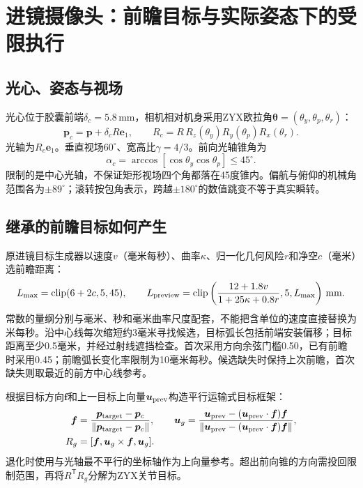 \documentclass[UTF8,a4paper,zihao=5,fontset=windows]{ctexart}
\newcommand{\vect}[1]{\bm{#1}}
\newcommand{\norm}[1]{\left\lVert#1\right\rVert}
\newcommand{\clip}{\operatorname{clip}}
\newcommand{\unit}[1]{\,\mathrm{#1}}
\begin{document}
\section{进镜摄像头：前瞻目标与实际姿态下的受限执行}
\subsection{光心、姿态与视场}
光心位于胶囊前端$\delta_c=5.8\unit{mm}$，相机相对机身采用ZYX欧拉角$\vect\theta=(\theta_y,\theta_p,\theta_r)$：
\begin{equation}
\vect p_c=\vect p+\delta_cR\vect e_1,\qquad
R_c=R\,R_z(\theta_y)R_y(\theta_p)R_x(\theta_r).
\label{eq:camera_mount}
\end{equation}
光轴为$R_c\vect e_1$。垂直视场$60^\circ$、宽高比$\gamma=4/3$。前向光轴锥角为
\begin{equation}
\alpha_c=\arccos[\cos\theta_y\cos\theta_p]\le45^\circ.
\label{eq:camera_cone}
\end{equation}
限制的是中心光轴，不保证矩形视场四个角都落在45度锥内。偏航与俯仰的机械角范围各为$\pm89^\circ$；滚转按包角表示，跨越$\pm180^\circ$的数值跳变不等于真实瞬转。

\subsection{继承的前瞻目标如何产生}
原进镜目标生成器以速度$v$（毫米每秒）、曲率$\kappa$、归一化几何风险$r$和净空$c$（毫米）选前瞻距离：
\begin{equation}
L_{\max}=\clip(6+2c,5,45),\qquad
L_{\rm preview}=\clip\left(\frac{12+1.8v}{1+25\kappa+0.8r},5,L_{\max}\right)\unit{mm}.
\label{eq:lookahead}
\end{equation}
常数的量纲分别与毫米、秒和毫米曲率尺度配套，不能把含单位的速度直接替换为米每秒。沿中心线每次缩短约3毫米寻找候选，目标弧长包括前端安装偏移；目标距离至少0.5毫米，并经过射线遮挡检查。首次采用方向余弦门槛0.50，已有前瞻时采用0.45；前瞻弧长变化率限制为10毫米每秒。候选缺失时保持上次前瞻，首次缺失则取最近的前方中心线参考。

根据目标方向$\vect f$和上一目标上向量$\vect u_{\rm prev}$构造平行运输式目标框架：
\begin{align}
\vect f&=\frac{\vect p_{\rm target}-\vect p_c}{\norm{\vect p_{\rm target}-\vect p_c}},\qquad
\vect u_g=\frac{\vect u_{\rm prev}-(\vect u_{\rm prev}\cdot\vect f)\vect f}{\norm{\vect u_{\rm prev}-(\vect u_{\rm prev}\cdot\vect f)\vect f}},\\
R_g&=[\vect f,\vect u_g\times\vect f,\vect u_g].
\label{eq:camera_frame}
\end{align}
退化时使用与光轴最不平行的坐标轴作为上向量参考。超出前向锥的方向需投回限制范围，再将$R^{\mathsf T}R_g$分解为ZYX关节目标。
\end{document}
